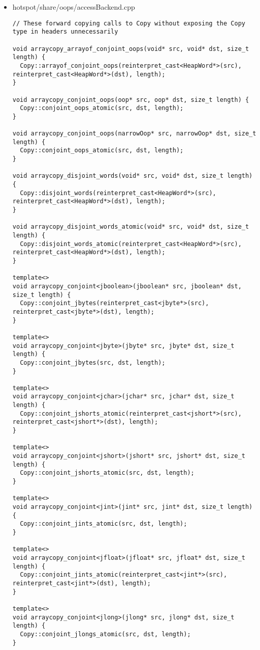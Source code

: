 \begin{itemize}
\item hotspot/share/oops/accessBackend.cpp\\
\begin{verbatim}
// These forward copying calls to Copy without exposing the Copy type in headers unnecessarily

void arraycopy_arrayof_conjoint_oops(void* src, void* dst, size_t length) {
  Copy::arrayof_conjoint_oops(reinterpret_cast<HeapWord*>(src), reinterpret_cast<HeapWord*>(dst), length);
}

void arraycopy_conjoint_oops(oop* src, oop* dst, size_t length) {
  Copy::conjoint_oops_atomic(src, dst, length);
}

void arraycopy_conjoint_oops(narrowOop* src, narrowOop* dst, size_t length) {
  Copy::conjoint_oops_atomic(src, dst, length);
}

void arraycopy_disjoint_words(void* src, void* dst, size_t length) {
  Copy::disjoint_words(reinterpret_cast<HeapWord*>(src), reinterpret_cast<HeapWord*>(dst), length);
}

void arraycopy_disjoint_words_atomic(void* src, void* dst, size_t length) {
  Copy::disjoint_words_atomic(reinterpret_cast<HeapWord*>(src), reinterpret_cast<HeapWord*>(dst), length);
}

template<>
void arraycopy_conjoint<jboolean>(jboolean* src, jboolean* dst, size_t length) {
  Copy::conjoint_jbytes(reinterpret_cast<jbyte*>(src), reinterpret_cast<jbyte*>(dst), length);
}

template<>
void arraycopy_conjoint<jbyte>(jbyte* src, jbyte* dst, size_t length) {
  Copy::conjoint_jbytes(src, dst, length);
}

template<>
void arraycopy_conjoint<jchar>(jchar* src, jchar* dst, size_t length) {
  Copy::conjoint_jshorts_atomic(reinterpret_cast<jshort*>(src), reinterpret_cast<jshort*>(dst), length);
}

template<>
void arraycopy_conjoint<jshort>(jshort* src, jshort* dst, size_t length) {
  Copy::conjoint_jshorts_atomic(src, dst, length);
}

template<>
void arraycopy_conjoint<jint>(jint* src, jint* dst, size_t length) {
  Copy::conjoint_jints_atomic(src, dst, length);
}

template<>
void arraycopy_conjoint<jfloat>(jfloat* src, jfloat* dst, size_t length) {
  Copy::conjoint_jints_atomic(reinterpret_cast<jint*>(src), reinterpret_cast<jint*>(dst), length);
}

template<>
void arraycopy_conjoint<jlong>(jlong* src, jlong* dst, size_t length) {
  Copy::conjoint_jlongs_atomic(src, dst, length);
}


\end{verbatim}
\end{itemize}
